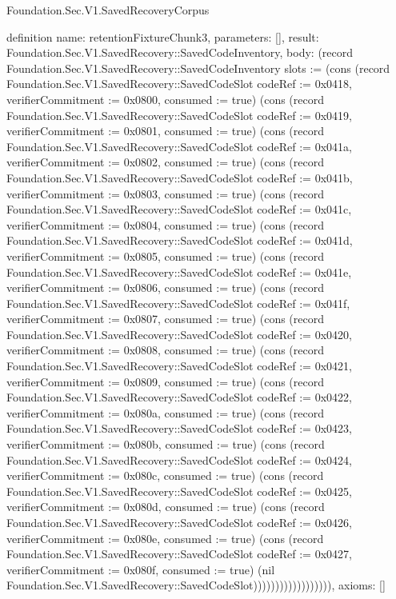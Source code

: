 \begin{lexlean}{Foundation.Sec.V1.SavedRecoveryCorpus}
\begin{semanticmodule}
definition{
  name: retentionFixtureChunk3,
  parameters: [],
  result: Foundation.Sec.V1.SavedRecovery::SavedCodeInventory,
  body: (record Foundation.Sec.V1.SavedRecovery::SavedCodeInventory {slots := (cons (record Foundation.Sec.V1.SavedRecovery::SavedCodeSlot {codeRef := 0x0418, verifierCommitment := 0x0800, consumed := true}) (cons (record Foundation.Sec.V1.SavedRecovery::SavedCodeSlot {codeRef := 0x0419, verifierCommitment := 0x0801, consumed := true}) (cons (record Foundation.Sec.V1.SavedRecovery::SavedCodeSlot {codeRef := 0x041a, verifierCommitment := 0x0802, consumed := true}) (cons (record Foundation.Sec.V1.SavedRecovery::SavedCodeSlot {codeRef := 0x041b, verifierCommitment := 0x0803, consumed := true}) (cons (record Foundation.Sec.V1.SavedRecovery::SavedCodeSlot {codeRef := 0x041c, verifierCommitment := 0x0804, consumed := true}) (cons (record Foundation.Sec.V1.SavedRecovery::SavedCodeSlot {codeRef := 0x041d, verifierCommitment := 0x0805, consumed := true}) (cons (record Foundation.Sec.V1.SavedRecovery::SavedCodeSlot {codeRef := 0x041e, verifierCommitment := 0x0806, consumed := true}) (cons (record Foundation.Sec.V1.SavedRecovery::SavedCodeSlot {codeRef := 0x041f, verifierCommitment := 0x0807, consumed := true}) (cons (record Foundation.Sec.V1.SavedRecovery::SavedCodeSlot {codeRef := 0x0420, verifierCommitment := 0x0808, consumed := true}) (cons (record Foundation.Sec.V1.SavedRecovery::SavedCodeSlot {codeRef := 0x0421, verifierCommitment := 0x0809, consumed := true}) (cons (record Foundation.Sec.V1.SavedRecovery::SavedCodeSlot {codeRef := 0x0422, verifierCommitment := 0x080a, consumed := true}) (cons (record Foundation.Sec.V1.SavedRecovery::SavedCodeSlot {codeRef := 0x0423, verifierCommitment := 0x080b, consumed := true}) (cons (record Foundation.Sec.V1.SavedRecovery::SavedCodeSlot {codeRef := 0x0424, verifierCommitment := 0x080c, consumed := true}) (cons (record Foundation.Sec.V1.SavedRecovery::SavedCodeSlot {codeRef := 0x0425, verifierCommitment := 0x080d, consumed := true}) (cons (record Foundation.Sec.V1.SavedRecovery::SavedCodeSlot {codeRef := 0x0426, verifierCommitment := 0x080e, consumed := true}) (cons (record Foundation.Sec.V1.SavedRecovery::SavedCodeSlot {codeRef := 0x0427, verifierCommitment := 0x080f, consumed := true}) (nil Foundation.Sec.V1.SavedRecovery::SavedCodeSlot)))))))))))))))))}),
  axioms: []
}


\end{semanticmodule}
\end{lexlean}

